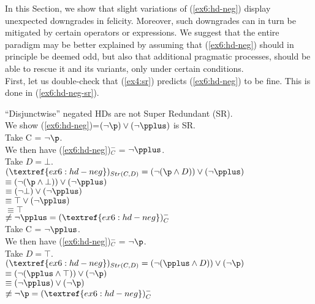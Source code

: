In this Section, we show that slight variations of (\ref{ex6:hd-neg}) display unexpected downgrades in felicity. Moreover, such downgrades can in turn be mitigated by certain operators or expressions. We suggest that the entire paradigm may be better explained by assuming that (\ref{ex6:hd-neg}) should in principle be deemed odd, but also that additional pragmatic processes, should be able to rescue it and its variants, only under certain conditions.\\

First, let us double-check that (\ref{ex4:sr}) predicts (\ref{ex6:hd-neg}) to be fine. This is done in (\ref{ex6:hd-neg-sr}).

\begin{exe}
	\ex\label{ex6:hd-neg-sr} {``Disjunctwise'' negated HDs are not Super Redundant (SR).\\
		We show (\ref{ex6:hd-neg})=$(\neg\p)\vee(\neg\pplus)$ is SR.\\
		Take C = $\neg\p$.\\
		We then have (\ref{ex6:hd-neg})$^-_C$ = $\neg\pplus$.\\
		Take $D=\bot$.\\
		$(\textref{ex6:hd-neg})_{Str(C, D)} = (\neg(\p \wedge D)) \vee (\neg\pplus)$\\
		 $\equiv (\neg(\p \wedge \bot)) \vee (\neg\pplus)$\\
		 $\equiv (\neg\bot) \vee (\neg\pplus)$\\
		 $\equiv \top \vee (\neg\pplus)$\\
		 $\equiv \top$\\
		 $\not\equiv \neg\pplus = (\textref{ex6:hd-neg})^-_C$\\
		Take C = $\neg\pplus$.\\
		We then have (\ref{ex6:hd-neg})$^-_C$ = $\neg\p$.\\
		Take $D=\top$.\\
		$(\textref{ex6:hd-neg})_{Str(C, D)} = (\neg(\pplus \wedge D)) \vee (\neg\p)$\\
		 $\equiv (\neg(\pplus \wedge \top)) \vee (\neg\p)$\\
		 $\equiv (\neg\pplus) \vee (\neg\p)$\\
		 $\not\equiv \neg\p = (\textref{ex6:hd-neg})^-_C$
	}
\end{exe}

